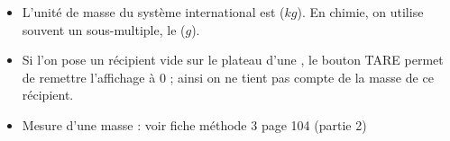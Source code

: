 \begin{mybilan}
	\begin{itemize}
		\item L'unité de masse du système international est  ($kg$). En chimie, on utilise souvent un sous-multiple, le  ($g$).
		\item Si l'on pose un récipient vide sur le plateau d'une , le bouton TARE permet de remettre l'affichage à 0 ; ainsi on ne tient pas compte de la masse de ce récipient.
		\item Mesure d'une masse : voir fiche méthode 3 page 104 (partie 2)
	\end{itemize}
\end{mybilan}
